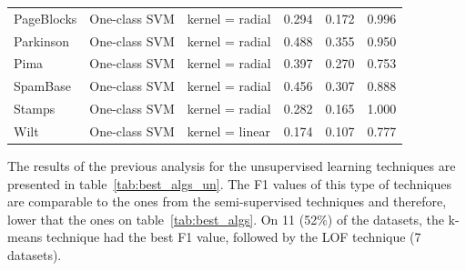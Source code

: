 \begin{table}[!ht]
\begin{tabular}{@{}llllll@{}}
	PageBlocks & One-class SVM & kernel = radial & 0.294 & 0.172 & 0.996 \\
	Parkinson & One-class SVM & kernel = radial & 0.488 & 0.355 & 0.950 \\
	Pima & One-class SVM & kernel = radial & 0.397 & 0.270 & 0.753 \\
	SpamBase & One-class SVM & kernel = radial & 0.456 & 0.307 & 0.888 \\
	Stamps & One-class SVM & kernel = radial & 0.282 & 0.165 & 1.000 \\
	Wilt & One-class SVM & kernel = linear & 0.174 & 0.107 & 0.777 \\ \bottomrule
\end{tabular}
\end{table}

The results of the previous analysis for the unsupervised learning techniques are presented in table~\ref{tab:best_algs_un}.
The F1 values of this type of techniques are comparable to the ones from the semi-supervised techniques and therefore, lower that the ones on table~\ref{tab:best_algs}.
On 11 (52\%) of the datasets, the k-means technique had the best F1 value, followed by the LOF technique (7 datasets).

